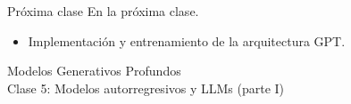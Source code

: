 \documentclass{beamer}
\begin{document}
\begin{frame}{Próxima clase}
    En la próxima clase.
    \begin{itemize}
        \item Implementación y entrenamiento de la arquitectura GPT.
    \end{itemize}
\end{frame}

\begin{frame}
    \centering
    \Large{Modelos Generativos Profundos}\\
    \large{Clase 5: Modelos autorregresivos y LLMs (parte I)}
\end{frame}
\end{document}
